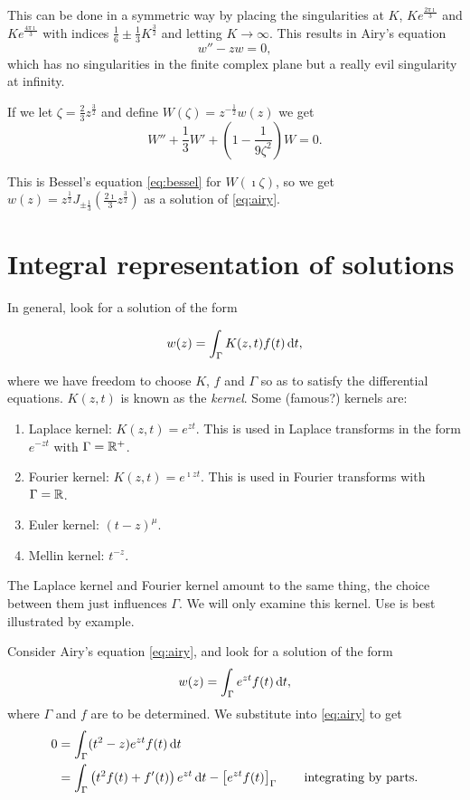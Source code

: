 \documentclass{notes}
\theoremstyle{plain}
\begin{document}
This can be done in a symmetric way by placing the singularities
at $K$, $Ke^{\frac{2 \pi \imath}{3}}$ and $K e^{\frac{4 \pi \imath}{3}}$
with indices $\frac{1}{6} \pm \frac{1}{3} K^{\frac{3}{2}}$ and letting
$K \to \infty$.  This results in Airy's equation
\begin{equation}\label{eq:airy}
w'' - z w = 0,
\end{equation}
which has no singularities in the finite complex plane but a really
evil singularity at infinity.

If we let $\zeta = \frac{2}{3}z^{\frac{3}{2}}$ and define
$W(\zeta) = z^{-\frac{1}{2}} w(z)$ we get
\[
W'' + \frac{1}{3} W' + \left(1 - \frac{1}{9 \zeta^2} \right) W = 0.
\]

This is Bessel's equation \eqref{eq:bessel} for $W(\imath \zeta)$, so
we get $w(z) = z^{\frac{1}{2}}
J_{\pm \frac{1}{3}}(\tfrac{2 \imath}{3} z^{\frac{3}{2}})$ as a solution
of \eqref{eq:airy}.

\section{Integral representation of solutions}

In general, look for a solution of the form

\begin{equation}\label{eq:kernel}
w(z) = \int_\Gamma K(z,t) f(t)\, \mathrm{d} t,
\end{equation}

where we have freedom to choose $K$, $f$ and $\Gamma$ so as to satisfy the
differential equations.  $K(z,t)$ is known as the \emph{kernel}.  Some
(famous?) kernels are:

\begin{enumerate}
\item Laplace kernel: $K(z,t) = e^{z t}$.  This is used in Laplace transforms
in the form $e^{-z t}$ with $\Gamma = \mathbb{R}^+$.
\item Fourier kernel: $K(z,t) = e^{\imath z t}$.  This is used in Fourier
transforms with $\Gamma = \mathbb{R}$.
\item Euler kernel: $(t-z)^\mu$.
\item Mellin kernel: $t^{-z}$.
\end{enumerate}

The Laplace kernel and Fourier kernel amount to the same thing, the choice
between them just influences $\Gamma$.  We will only examine this kernel.
Use is best illustrated by example.

Consider Airy's equation \eqref{eq:airy}, and look for a solution
of the form
\[
w(z) = \int_\Gamma e^{z t} f(t)\, \mathrm{d} t,
\]
where $\Gamma$ and $f$ are to be determined.  We substitute into
\eqref{eq:airy} to get
\begin{align*}
0 &= \int_\Gamma (t^2 - z) e^{z t} f(t)\, \mathrm{d} t \\
&= \int_\Gamma \left(t^2 f(t) + f'(t) \right) e^{z t}\, \mathrm{d} t - 
\left[e^{z t} f(t) \right]_\Gamma \qquad \text{integrating by parts.}
\end{align*}
\end{document}
